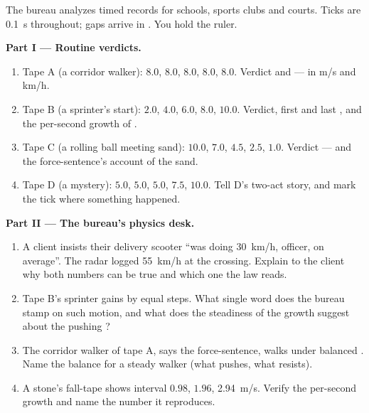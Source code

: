 \begin{problem}\label{pb:g9:uniform-varied-motion:1}
The bureau analyzes timed records for schools, sports clubs
and courts. Ticks are \qty{0.1}{s} throughout; gaps arrive
in . You hold the ruler.

\medskip\noindent\textbf{Part I --- Routine verdicts.}
\begin{enumerate}
  \item Tape A (a corridor walker): $8.0$, $8.0$, $8.0$,
        $8.0$, $8.0$. Verdict and  --- in \unit{m/s}
        and \unit{km/h}.
  \item Tape B (a sprinter's start): $2.0$, $4.0$, $6.0$,
        $8.0$, $10.0$. Verdict, first and last , and
        the per-second growth of .
  \item Tape C (a rolling ball meeting sand): $10.0$,
        $7.0$, $4.5$, $2.5$, $1.0$. Verdict --- and the
        force-sentence's account of the sand.
  \item Tape D (a mystery): $5.0$, $5.0$, $5.0$, $7.5$,
        $10.0$. Tell D's two-act story, and mark the tick
        where something happened.
\end{enumerate}

\medskip\noindent\textbf{Part II --- The bureau's physics
desk.}
\begin{enumerate}[resume]
  \item A client insists their delivery scooter ``was doing
        \qty{30}{km/h}, officer, on average''. The radar
        logged \qty{55}{km/h} at the crossing. Explain to
        the client why both numbers can be true and which
        one the law reads.
  \item Tape B's sprinter gains  by equal steps.
        What single word does the bureau stamp on such
        motion, and what does the steadiness of the growth
        suggest about the pushing ?
  \item The corridor walker of tape A, says the
        force-sentence, walks under balanced . Name
        the balance for a steady walker (what pushes, what
        resists).
  \item A stone's fall-tape shows interval  $0.98$,
        $1.96$, \qty{2.94}{m/s}. Verify the per-second
        growth and name the number it reproduces.
\end{enumerate}


\end{problem}
